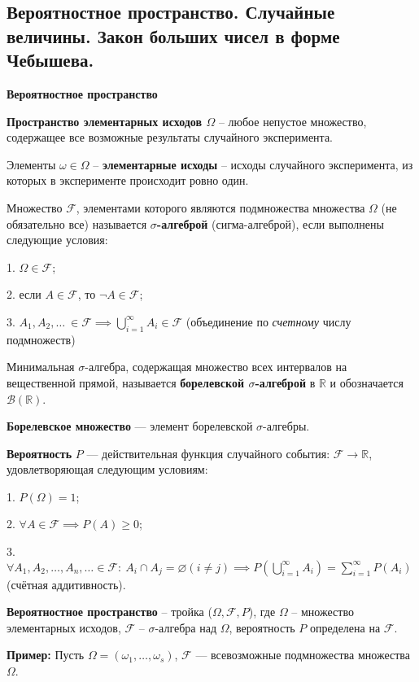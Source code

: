 \subsection{Вероятностное пространство. Случайные величины. Закон больших чисел в форме Чебышева.}

\centerline{\textbf{Вероятностное пространство}}

\textbf{Пространство элементарных исходов $\Omega$} -- любое непустое множество, содержащее все возможные результаты случайного эксперимента.

Элементы $\omega \in \Omega$ -- \textbf{элементарные исходы} -- исходы случайного эксперимента, из которых в эксперименте происходит ровно один. 

Множество $\mathcal{F}$, элементами которого являются подмножества множества $\Omega$ (не обязательно все) называется \textbf{$\sigma$-алгеброй} (сигма-алгеброй), если выполнены следующие условия:

1. $\Omega \in \mathcal{F}$;

2. если $A \in \mathcal{F}$, то $\neg A \in \mathcal{F}$;

3. $A_1,A_2,\dots~\in \mathcal{F} \implies \bigcup_{i=1}^{\infty} A_i \in \mathcal{F}$ (объединение по \textit{счетному} числу подмножеств)


Минимальная $\sigma$-алгебра, содержащая множество всех интервалов на вещественной прямой, называется \textbf{борелевской $\sigma$-алгеброй} в $\mathbb{R}$ и обозначается $\mathcal{B}(\mathbb{R})$. 

\textbf{Борелевское множество} --- элемент борелевской $\sigma$-алгебры.

\textbf{Вероятность} $P$ --- действительная функция случайного события: $\mathcal{F} \rightarrow \mathbb{R}$, удовлетворяющая следующим условиям:

1. $P(\Omega) = 1$;

2.  $\forall A \in \mathcal{F}\implies P(A) \geqslant 0$;

3. $\forall A_1,A_2,\dots,A_n,\dots \in \mathcal{F}:~A_i \cap A_j = \varnothing (i \neq j) \implies P(\displaystyle\bigcup_{i=1}^{\infty}A_i) = \displaystyle\sum_{i=1}^{\infty}P(A_i)$ (счётная аддитивность).


\textbf{Вероятностное пространство} -- тройка ($\Omega, \mathcal{F}, P$), где $\Omega$ -- множество элементарных исходов, $\mathcal{F}$ -- $\sigma$-алгебра над $\Omega$, вероятность $P$ определена на $\mathcal{F}$.

\textbf{Пример: }
Пусть $\Omega = (\omega_1,\dots,\omega_s)$, $\mathcal{F}$ --- всевозможные подмножества множества $\Omega$.

